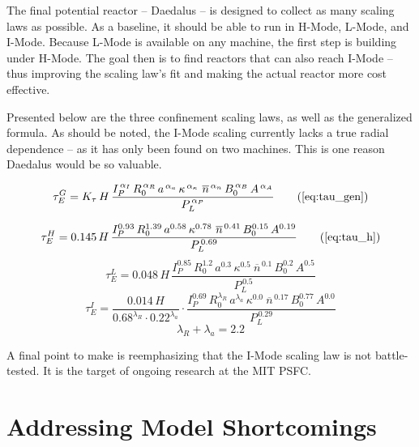 The final potential reactor -- Daedalus -- is designed to collect as many scaling laws as possible. As a baseline, it should be able to run in H-Mode, L-Mode, and I-Mode. Because L-Mode is available on any machine, the first step is building under H-Mode. The goal then is to find reactors that can also reach I-Mode -- thus improving the scaling law's fit and making the  actual reactor more cost effective.

Presented below are the three confinement scaling laws, as well as the generalized formula. As should be noted, the I-Mode scaling currently lacks a true radial dependence -- as it has only been found on two machines. This is one reason Daedalus would be so valuable.

\begin{equation}
  \tau_E^G = K_\tau \, H \, \frac{
    I_P^{\,\alpha_I} \, R_0^{\,\alpha_R} \, a^{\,\alpha_a} \, \kappa^{\,\alpha_\kappa} \ \overline{n}^{\,\alpha_n} \, B_0^{\,\alpha_B} \, A^{\,\alpha_A}
  }{ P_L ^ {\,\alpha_P} }
  \tag{\ref{eq:tau_gen}}
\end{equation}

\begin{equation}
  \tau_E^H = 0.145 \, H \, \frac{
    I_P^{0.93} \, R_0^{1.39} \, a^{0.58} \, \kappa^{0.78} \ \overline{n}^{\, 0.41} \, B_0^{0.15} \, A^{0.19}
  }{ P_L ^ {\,0.69} }
  \tag{\ref{eq:tau_h}}
\end{equation}
\begin{equation}
  \tau_E^L = 0.048\, H \, \frac{
    I_P^{0.85} \, R_0^{1.2} \, a^{0.3} \, \kappa^{0.5} \ \overline{n}^{\, 0.1} \, B_0^{0.2} \, A^{0.5} }{ P_L ^ {\,0.5} }
\end{equation}
\begin{equation}
  \tau_E^I = \frac{ 0.014 \, H }{ 0.68 ^ {\lambda_R} \cdot 0.22 ^ {\lambda_a} } \cdot \frac{ I_P^{0.69} \, R_0^{\lambda_R} \, a^{\lambda_a} \, \kappa^{0.0} \ \overline{n}^{\, 0.17} \, B_0^{0.77} \, A^{0.0} }{ P_L ^ {\,0.29} }
\end{equation}
\begin{equation}
	\lambda_R + \lambda_a = 2.2
\end{equation}

A final point to make is reemphasizing that the I-Mode scaling law is not battle-tested. It is the target of ongoing research at the MIT PSFC.

\section{Addressing Model Shortcomings}

